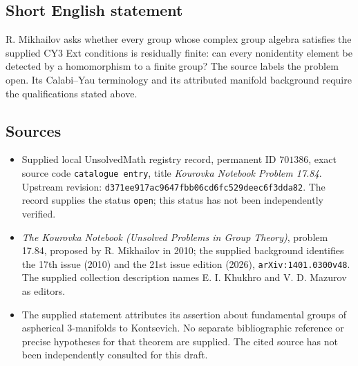 \documentclass[11pt]{article}
\begin{document}
\subsection{Short English statement}
R. Mikhailov asks whether every group whose complex group algebra satisfies the supplied CY\(3\) Ext conditions is residually finite: can every nonidentity element be detected by a homomorphism to a finite group? The source labels the problem open. Its Calabi--Yau terminology and its attributed manifold background require the qualifications stated above.
\subsection{Sources}
\begin{itemize}
\item Supplied local UnsolvedMath registry record, permanent ID \(701386\), exact source code \texttt{catalogue entry}, title \emph{Kourovka Notebook Problem 17.84}. Upstream revision: \texttt{d371ee917ac9647fbb06cd6fc529deec6f3dda82}. The record supplies the status \texttt{open}; this status has not been independently verified.
\item \emph{The Kourovka Notebook (Unsolved Problems in Group Theory)}, problem 17.84, proposed by R. Mikhailov in 2010; the supplied background identifies the 17th issue (2010) and the 21st issue edition (2026), \texttt{arXiv:1401.0300v48}. The supplied collection description names E. I. Khukhro and V. D. Mazurov as editors.
\item The supplied statement attributes its assertion about fundamental groups of aspherical \(3\)-manifolds to Kontsevich. No separate bibliographic reference or precise hypotheses for that theorem are supplied. The cited source has not been independently consulted for this draft.
\end{itemize}
\end{document}
